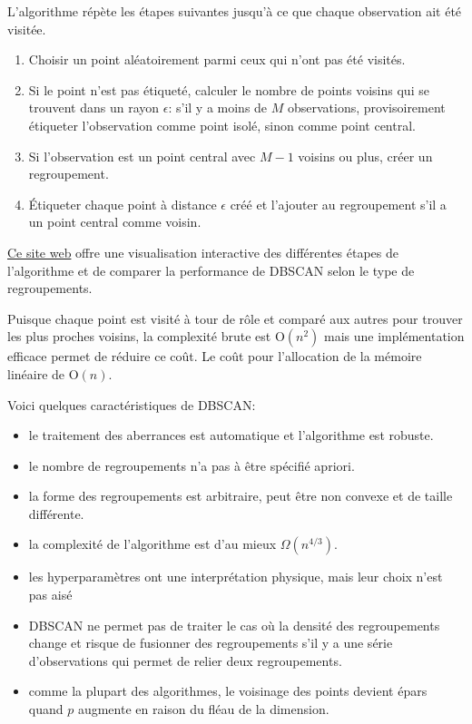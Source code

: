 \documentclass[
  11pt,
  letterpaper,
]{scrbook}
\providecommand{\tightlist}{%
  \setlength{\itemsep}{0pt}\setlength{\parskip}{0pt}}\usepackage{longtable,booktabs,array}
\theoremstyle{definition}
\theoremstyle{remark}
\begin{document}
L'algorithme répète les étapes suivantes jusqu'à ce que chaque
observation ait été visitée.

\begin{enumerate}
\def\labelenumi{\arabic{enumi}.}
\tightlist
\item
  Choisir un point aléatoirement parmi ceux qui n'ont pas été visités.
\item
  Si le point n'est pas étiqueté, calculer le nombre de points voisins
  qui se trouvent dans un rayon \(\epsilon\): s'il y a moins de \(M\)
  observations, provisoirement étiqueter l'observation comme point
  isolé, sinon comme point central.
\item
  Si l'observation est un point central avec \(M-1\) voisins ou plus,
  créer un regroupement.
\item
  Étiqueter chaque point à distance \(\epsilon\) créé et l'ajouter au
  regroupement s'il a un point central comme voisin.
\end{enumerate}

\href{https://www.naftaliharris.com/blog/visualizing-dbscan-clustering/}{Ce
site web} offre une visualisation interactive des différentes étapes de
l'algorithme et de comparer la performance de DBSCAN selon le type de
regroupements.

Puisque chaque point est visité à tour de rôle et comparé aux autres
pour trouver les plus proches voisins, la complexité brute est
\(\mathrm{O}(n^2)\) mais une implémentation efficace permet de réduire
ce coût. Le coût pour l'allocation de la mémoire linéaire de
\(\mathrm{O}(n)\).

Voici quelques caractéristiques de DBSCAN:

\begin{itemize}
\tightlist
\item
  le traitement des aberrances est automatique et l'algorithme est
  robuste.
\item
  le nombre de regroupements n'a pas à être spécifié apriori.
\item
  la forme des regroupements est arbitraire, peut être non convexe et de
  taille différente.
\item
  la complexité de l'algorithme est d'au mieux \(\Omega(n^{4/3})\).
\item
  les hyperparamètres ont une interprétation physique, mais leur choix
  n'est pas aisé
\item
  DBSCAN ne permet pas de traiter le cas où la densité des regroupements
  change et risque de fusionner des regroupements s'il y a une série
  d'observations qui permet de relier deux regroupements.
\item
  comme la plupart des algorithmes, le voisinage des points devient
  épars quand \(p\) augmente en raison du fléau de la dimension.
\end{itemize}
\end{document}
